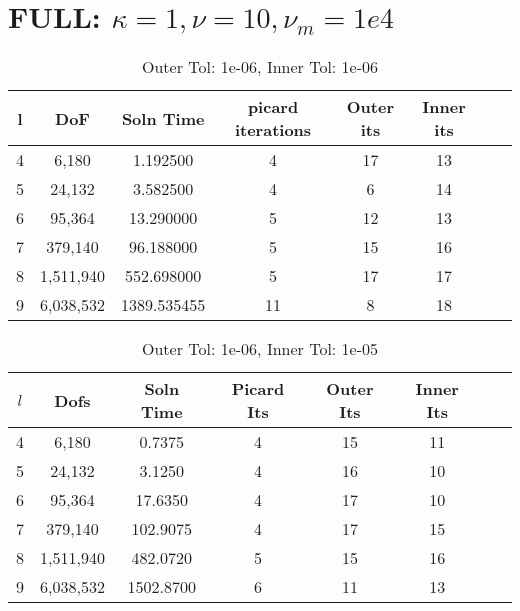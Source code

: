 \documentclass{article}
\begin{document}
\section*{FULL: $\kappa = 1,\nu = 10, \nu_m = 1e4$}



\begin{table}[h!] \small
\begin{center}
\begin{tabular}{cccccccc}
\hline
  l &      DoF &    Soln Time &  picard iterations &  Outer its &  Inner its \\
\hline
           4 &     6,180 &     1.192500 &                  4 &         17 &         13 \\
           5 &    24,132 &     3.582500 &                  4 &         6 &         14 \\
           6 &    95,364 &    13.290000 &                  5 &         12 &         13 \\
           7 &   379,140 &    96.188000 &                  5 &         15 &         16 \\
           8 &  1,511,940 &   552.698000 &                  5 &         17 &         17 \\
           9 &  6,038,532 &  1389.535455 &                 11 &          8 &         18 \\
    \hline
\end{tabular}
\caption{Outer Tol:   1e-06,       Inner Tol:    1e-06}

\end{center}
\end{table}

\begin{table}[h!] \small
\begin{center}
\begin{tabular}{cccccccc}
\hline
$l$ &    Dofs & Soln Time & Picard Its & Outer Its & Inner Its \\
\hline
4 &     6,180 &     0.7375 &                  4 &         15 &         11 \\
5 &    24,132 &     3.1250 &                  4 &         16 &         10 \\
6 &    95,364 &    17.6350 &                  4 &         17 &         10 \\
7 &   379,140 &   102.9075 &                  4 &         17 &         15 \\
8 &  1,511,940 &   482.0720 &                  5 &         15 &         16 \\
9 &  6,038,532 &  1502.8700 &                  6 &         11 &         13 \\
\hline
\end{tabular}
\caption{Outer Tol:   1e-06,       Inner Tol:    1e-05}

\end{center}
\end{table}
\end{document}
